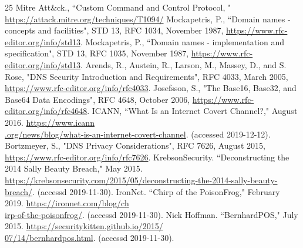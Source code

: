 \documentclass[12pt]{jarticle} %
\begin{document}
\newpage
%
\begin{thebibliography} {25}\small
  Mitre Att\&ck., ``Custom Command and Control Protocol, " \href{https://attack.mitre.org/techniques/T1094/}{https://attack.mitre.org/techniques/T1094/}
  Mockapetris, P., ``Domain names - concepts and facilities", STD 13, RFC 1034, November 1987, \href{https://www.rfc-editor.org/info/std13}{https://www.rfc-editor.org/info/std13}.
  Mockapetris, P., ``Domain names - implementation and specification", STD 13, RFC 1035, November 1987, \href{https://www.rfc-editor.org/info/std13}{https://www.rfc-editor.org/info/std13}.
  Arends, R., Austein, R., Larson, M., Massey, D., and S. Rose, "DNS Security Introduction and Requirements", RFC 4033, March 2005, \href{{https://www.rfc-editor.org/info/rfc4033}}{https://www.rfc-editor.org/info/rfc4033}.
  Josefsson, S., "The Base16, Base32, and Base64 Data Encodings", RFC 4648, October 2006, \href{https://www.rfc-editor.org/info/rfc4648}{https://www.rfc-editor.org/info/rfc4648}.
  ICANN, ``What Is an Internet Covert Channel?," August 2016. \href{https://www.icann.org/news/blog/what-is-an-internet-covert-channel}{https://www.icann\\.org/news/blog/what-is-an-internet-covert-channel}. (accessed 2019-12-12).
  Bortzmeyer, S., "DNS Privacy Considerations", RFC 7626, August 2015, \href{https://www.rfc-editor.org/info/rfc7626}{https://www.rfc-editor.org/info/rfc7626}.
  KrebsonSecurity. ``Deconstructing the 2014 Sally Beauty Breach," May 2015. \href{https://krebsonsecurity.com/2015/05/deconstructing-the-2014-sally-beauty-breach/}{https://krebsonsecurity.com/2015/05/deconstructing-the-2014-sally-beauty-breach/}. (accessd 2019-11-30).
  IronNet. ``Chirp of the PoisonFrog," February 2019. \href{https://ironnet.com/blog/chirp-of-the-poisonfrog/}{https://ironnet.com/blog/ch\\irp-of-the-poisonfrog/}. (accessd 2019-11-30).
  Nick Hoffman. ``BernhardPOS," July 2015. \href{https://securitykitten.github.io/2015/07/14/bernhardpos.html}{https://securitykitten.github.io/2015/\\07/14/bernhardpos.html}. (accessd 2019-11-30).

\end{thebibliography}
\end{document}
